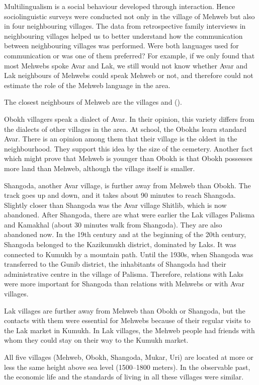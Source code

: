 \documentclass[output=paper]{langsci/langscibook}
\begin{document}
Multilingualism is a social behaviour developed through interaction.
Hence sociolinguistic surveys were conducted not only in the village of
Mehweb but also in four neighbouring villages. The data from
retrospective family interviews in neighbouring villages helped us to
better understand how the communication between neighbouring villages
was performed. Were both languages used for communication or was one of
them preferred? For example, if we only found that most Mehwebs spoke
Avar and Lak, we still would not know whether Avar and Lak neighbours of
Mehwebs could speak Mehweb or not, and therefore could not estimate the role of the
Mehweb language in the area.

The closest neighbours of Mehweb are the  villages  and
 ().

Obokh villagers speak a dialect of Avar. In their opinion, this variety
differs from the dialects of other villages in the area. At school, the
Obokhs learn standard Avar. There is an opinion among them that their
village is the oldest in the neighbourhood. They support this idea by
the size of the cemetery. Another fact which might prove that Mehweb is
younger than Obokh is that Obokh possesses more land than Mehweb,
although the village itself is smaller.

Shangoda, another Avar village, is further away from Mehweb than Obokh.
The track goes up and down, and it takes about 90 minutes to reach
Shangoda. Slightly closer than Shangoda was the Avar village Shitlib,
which is now abandoned. After Shangoda, there are what were earlier the Lak villages
Palisma and Kamakhal (about 30 minutes walk from Shangoda). They are
also abandoned now. In the 19th century and at the beginning of the
20th century, Shangoda belonged to the Kazikumukh district, dominated by
Laks. It was connected to Kumukh by a mountain path. Until the 1930s,
when Shangoda was transferred to the Gunib district, the inhabitants of
Shangoda had their administrative centre in the village of Palisma.
Therefore, relations with Laks were more important for Shangoda than
relations with Mehwebs or with Avar villages.

Lak villages are further away from Mehweb than Obokh or Shangoda, but
the contacts with them were essential for Mehwebs because of their
regular visits to the Lak market in Kumukh. In Lak villages, the Mehweb
people had friends with whom they could stay on their way to the Kumukh
market.

All five villages (Mehweb, Obokh, Shangoda, Mukar, Uri) are located at
more or less the same height above sea level (1500–1800 meters). In the
observable past, the economic life and the standards of living in all these
villages were similar.
\end{document}
